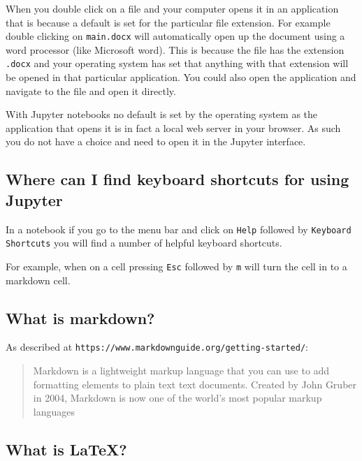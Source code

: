 When you double click on a file and your computer opens it in an application
that is because a default is set for the particular file extension. For example
double clicking on \texttt{main.docx} will automatically open up the document using a
word processor (like Microsoft word). This is because the file has the extension
\texttt{.docx} and your operating system has set that anything with that extension will
be opened in that particular application. You could also open the
application and navigate to the file and open it directly.

With Jupyter notebooks no default is set by the operating system as the
application that opens it is in fact a local web server in your browser. As such
you do not have a choice and need to open it in the Jupyter interface.


\subsection{Where can I find keyboard shortcuts for using Jupyter}

In a notebook if you go to the menu bar and click on \texttt{Help} followed by
\texttt{Keyboard Shortcuts} you will find a number of helpful keyboard shortcuts.


For example, when on a cell pressing \texttt{Esc} followed by \texttt{m} will turn the cell in
to a markdown cell.


\subsection{What is markdown?}

As described at \texttt{https://www.markdownguide.org/getting-started/}:

\begin{quote}
Markdown is a lightweight markup language that you can use to add formatting
elements to plain text text documents. Created by John Gruber in 2004,
Markdown is now one of the world’s most popular markup languages
\end{quote}


\subsection{What is LaTeX?}

